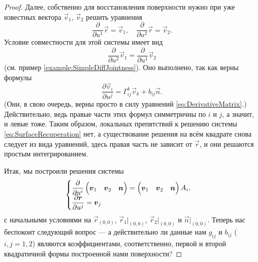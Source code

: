 \begin{proof}
	Далее, собственно для восстановления поверхности нужно при уже известных вектора $\vec{v}_1$, $\vec{v}_2$ решить уравнения
	\begin{equation} \label{eq:SurfaceRecuperation}
		\frac{\partial}{\partial u^1}\vec{r} = \vec{v}_1,\quad
		\frac{\partial}{\partial u^2}\vec{r} = \vec{v}_2.
	\end{equation}
	Условие совместности для этой системы имеет вид
	\[
		\frac{\partial}{\partial u^2}\vec{v}_1 = \frac{\partial}{\partial u^1}\vec{v}_2
	\]
	(см. пример \ref{example:SimpleDiffJointness}). Оно выполнено, так как верны формулы
	\[
		\frac{\partial\vec{v}_i}{\partial u^j} = \Gamma_{ij}^k\vec{v}_k + b_{ij}\vec{n}.
	\]
	(Они, в свою очередь, верны просто в силу уравнений \eqref{eq:DerivativeMatrix}.) Действительно, ведь правые части этих формул симметричны по $i$ и $j$, а значит, и левые тоже. Таким образом, локальных препятствий к решению системы \eqref{eq:SurfaceRecuperation} нет, а существование решения на всём квадрате снова следует из вида уравнений, здесь правая часть не зависит от $\vec{r}$, и они решаются простым интегрированием.

	Итак, мы построили решения системы 
	\[
		\begin{cases}
			\displaystyle\frac{\partial}{\partial u^i}
			\begin{pmatrix}
				\boldsymbol{v}_1 & \boldsymbol{v}_2 & \boldsymbol{n}
			\end{pmatrix} =
			\begin{pmatrix}
				\boldsymbol{v}_1 & \boldsymbol{v}_2 & \boldsymbol{n}
			\end{pmatrix}A_i,\\
			\displaystyle\frac{\partial \boldsymbol{r}}{\partial u^j} = \boldsymbol{v}_j
		\end{cases}
	\]
	с начальными условиями на $\vec{r}_{(0, 0)}$, $\vec{r}_1|_{(0, 0)}$, $\vec{r}_2|_{(0, 0)}$ и $\vec{n}|_{(0, 0)}$. Теперь нас беспокоит следующий вопрос --- а действительно ли данные нам $g_{ij}$ и $b_{ij}$ ($i, j = 1, 2$) являются коэффициентами, соответственно, первой и второй квадратичной формы построенной нами поверхности?


\end{proof}
